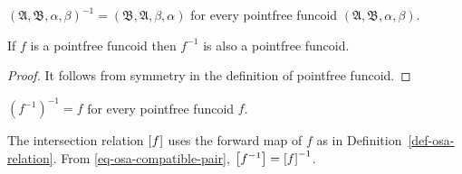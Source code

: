 \begin{defn}
$(\mathfrak{A},\mathfrak{B},\alpha,\beta)^{-1}=(\mathfrak{B},\mathfrak{A},\beta,\alpha)$
for every pointfree funcoid $(\mathfrak{A},\mathfrak{B},\alpha,\beta)$.\end{defn}
\begin{prop}
If $f$ is a pointfree funcoid then $f^{-1}$ is also a pointfree
funcoid.\end{prop}
\begin{proof}
It follows from symmetry in the definition of pointfree funcoid.\end{proof}
\begin{obvious}
$(f^{-1})^{-1}=f$ for every pointfree funcoid $f$.\end{obvious}
The intersection relation $\mathrel{\left[f\right]}$ uses the forward map of $f$
as in Definition~\ref{def-osa-relation}. From
\eqref{eq-osa-compatible-pair},
$\mathord{\mathrel{\left[f^{-1}\right]}}=\mathord{\mathrel{\left[f\right]}}^{-1}$.

